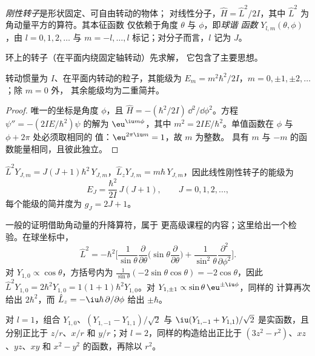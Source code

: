 \begin{definition}\label{def:b3:quantum-model-systems:rotor}
\emph{刚性转子}是形状固定、可自由转动的物体；
对线性分子，$\hat H = \hat L^2/2I$，其中 $\hat L^2$ 为
角动量平方的算符。其本征函数
仅依赖于角度 $\theta$ 与 $\phi$，即\emph{球谐
函数} $Y_{l,m}(\theta,\phi)$，由 $l =
0, 1, 2, \dots$ 与 $m = -l, \dots, l$ 标记；对分子而言，$l$ 记为 $J$。
\end{definition}

环上的转子（在平面内绕固定轴转动）先求解，
它包含了主要思想。

\begin{theorem}[环]\label{thm:b3:quantum-model-systems:ring}
转动惯量为 $I$、在平面内转动的粒子，其能级为
$E_m = m^2\hbar^2/2I$，$m = 0, \pm1, \pm2, \dots$；除 $m = 0$ 外，
其余能级均为二重简并。
\end{theorem}

\begin{proof}
唯一的坐标是角度 $\phi$，且 $\hat H = -(\hbar^2/2I)\,
\dd^2/\dd\phi^2$。方程 $\psi'' = -(2IE/\hbar^2)\psi$ 的解为 $\eu^{\iu
m\phi}$，其中 $m^2 = 2IE/\hbar^2$。单值函数在 $\phi$ 与 $\phi + 2\pi$ 处必须取相同的
值：$\eu^{2\pi\iu m} = 1$，故 $m$ 为整数。
具有 $m$ 与 $-m$ 的函数能量相同，且彼此独立。
\end{proof}

\begin{theorem}[刚性转子的能级]\label{thm:b3:quantum-model-systems:rotor}
$\hat L^2Y_{J,m} = J(J+1)\hbar^2\,Y_{J,m}$，$\hat L_zY_{J,m} = m\hbar\,
Y_{J,m}$，因此线性刚性转子的能级为
\[
E_J = \frac{\hbar^2}{2I}\,J(J+1), \qquad J = 0, 1, 2, \dots,
\]
每个能级的简并度为 $g_J = 2J + 1$。
\end{theorem}
\admitted

一般的证明借助角动量的升降算符，属于
更高级课程的内容；这里给出一个检验。在球坐标中，
\[
\hat L^2 = -\hbar^2\Big[\frac{1}{\sin\theta}\frac{\partial}{\partial\theta}
\Big(\sin\theta\frac{\partial}{\partial\theta}\Big) +
\frac{1}{\sin^2\theta}\frac{\partial^2}{\partial\phi^2}\Big].
\]
对 $Y_{1,0} \propto \cos\theta$，方括号内为 $\frac{1}{\sin\theta}(-2\sin\theta
\cos\theta) = -2\cos\theta$，因此 $\hat L^2Y_{1,0} = 2\hbar^2Y_{1,0} = 1(1+1)\hbar^2
Y_{1,0}$。对 $Y_{1,\pm1} \propto \sin\theta\,\eu^{\pm\iu\phi}$，同样的
计算再次给出 $2\hbar^2$，而 $\hat L_z = -\iu\hbar\,\partial/\partial
\phi$ 给出 $\pm\hbar$。

\begin{proposition}[实球谐函数]\label{prop:b3:quantum-model-systems:real-harmonics}
对 $l = 1$，组合 $Y_{1,0}$、$(Y_{1,-1} - Y_{1,1})/\sqrt2$ 与
$\iu(Y_{1,-1} + Y_{1,1})/\sqrt2$ 是实函数，且分别正比于 $z/r$、$x/r$ 和
$y/r$；对 $l = 2$，同样的构造给出正比于
$(3z^2 - r^2)$、$xz$、$yz$、$xy$ 和 $x^2 - y^2$ 的函数，再除以 $r^2$。
\end{proposition}

